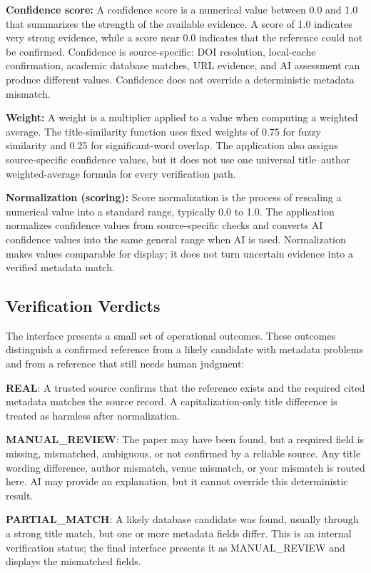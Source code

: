 \documentclass[12pt,a4paper,oneside]{report}
\begin{document}
\textbf{Confidence score:} A confidence score is a numerical value 
between 0.0 and 1.0 that summarizes the strength of the available 
evidence. A score of 1.0 indicates very strong evidence, while a score 
near 0.0 indicates that the reference could not be confirmed. Confidence 
is source-specific: DOI resolution, local-cache confirmation, academic 
database matches, URL evidence, and AI assessment can produce different 
values. Confidence does not override a deterministic metadata mismatch.

\textbf{Weight:} A weight is a multiplier applied to a value when 
computing a weighted average. The title-similarity function uses fixed 
weights of 0.75 for fuzzy similarity and 0.25 for significant-word 
overlap. The application also assigns source-specific confidence values, 
but it does not use one universal title--author weighted-average formula 
for every verification path.

\textbf{Normalization (scoring):} Score normalization is the process 
of rescaling a numerical value into a standard range, typically 0.0 
to 1.0. The application normalizes confidence values from source-specific 
checks and converts AI confidence values into the same general range when 
AI is used. Normalization makes values comparable for display; it does not 
turn uncertain evidence into a verified metadata match.

\subsection{Verification Verdicts}

The interface presents a small set of operational outcomes. These outcomes distinguish a confirmed reference from a likely candidate with metadata problems and from a reference that still needs human judgment:

\textbf{REAL}: A trusted source confirms that the reference exists and the required cited metadata matches the source record. A capitalization-only title difference is treated as harmless after normalization.

\textbf{MANUAL\_REVIEW}: The paper may have been found, but a required field is missing, mismatched, ambiguous, or not confirmed by a reliable source. Any title wording difference, author mismatch, venue mismatch, or year mismatch is routed here. AI may provide an explanation, but it cannot override this deterministic result.

\textbf{PARTIAL\_MATCH}: A likely database candidate was found, usually through a strong title match, but one or more metadata fields differ. This is an internal verification status; the final interface presents it as MANUAL\_REVIEW and displays the mismatched fields.
\end{document}
